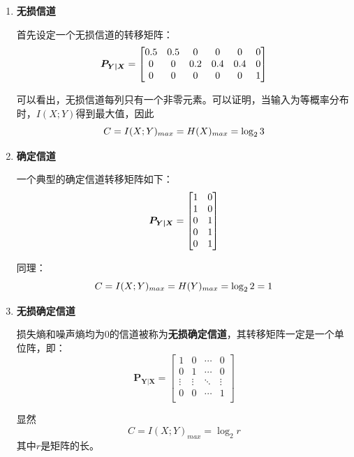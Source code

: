 \documentclass[UTF8,a4paper,11pt]{article}
\begin{document}
\begin{enumerate}
\item \textbf{无损信道}

首先设定一个无损信道的转移矩阵：
\begin{equation}
\notag
\bm{P_{Y|X}}=
\begin{bmatrix}
0.5&0.5&0&0&0&0\\
0&0&0.2&0.4&0.4&0\\
0&0&0&0&0&1\\
\end{bmatrix}
\end{equation}

可以看出，无损信道每列只有一个非零元素。可以证明，当输入为等概率分布时，$I(X;Y)$得到最大值，因此
\begin{equation}
\notag
C=I(X;Y)_{max}=H(X)_{max}=\log_{2}{3}
\end{equation}

\item \textbf{确定信道}

一个典型的确定信道转移矩阵如下：
\begin{equation}
\notag
\bm{P_{Y|X}}=
\begin{bmatrix}
1&0\\
1&0\\
0&1\\
0&1\\
0&1\\
\end{bmatrix}
\end{equation}

同理：
\begin{equation}
\notag
C=I(X;Y)_{max}=H(Y)_{max}=\log_{2}{2}=1
\end{equation}

\item \textbf{无损确定信道}

损失熵和噪声熵均为0的信道被称为\textbf{无损确定信道}，其转移矩阵一定是一个单位阵，即：
\begin{equation}
\bm{P_{Y|X}}=
\begin{bmatrix}
1&0&\cdots&0\\
0&1&\cdots&0\\
\vdots&\vdots&\ddots&\vdots\\
0&0&\cdots&1\\
\end{bmatrix}
\end{equation}

显然
\begin{equation}
C=I(X;Y)_{max}=\log_{2}{r}
\end{equation}
其中$r$是矩阵的长。
\end{enumerate}
\end{document}
